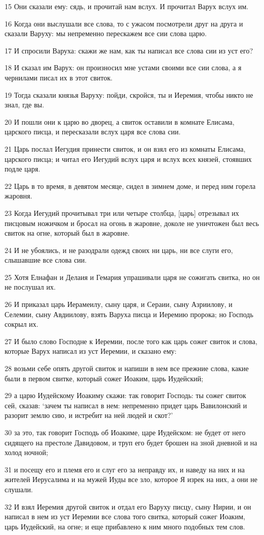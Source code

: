 \par 15 Они сказали ему: сядь, и прочитай нам вслух. И прочитал Варух вслух им.
\par 16 Когда они выслушали все слова, то с ужасом посмотрели друг на друга и сказали Варуху: мы непременно перескажем все сии слова царю.
\par 17 И спросили Варуха: скажи же нам, как ты написал все слова сии из уст его?
\par 18 И сказал им Варух: он произносил мне устами своими все сии слова, а я чернилами писал их в этот свиток.
\par 19 Тогда сказали князья Варуху: пойди, скройся, ты и Иеремия, чтобы никто не знал, где вы.
\par 20 И пошли они к царю во дворец, а свиток оставили в комнате Елисама, царского писца, и пересказали вслух царя все слова сии.
\par 21 Царь послал Иегудия принести свиток, и он взял его из комнаты Елисама, царского писца; и читал его Иегудий вслух царя и вслух всех князей, стоявших подле царя.
\par 22 Царь в то время, в девятом месяце, сидел в зимнем доме, и перед ним горела жаровня.
\par 23 Когда Иегудий прочитывал три или четыре столбца, [царь] отрезывал их писцовым ножичком и бросал на огонь в жаровне, доколе не уничтожен был весь свиток на огне, который был в жаровне.
\par 24 И не убоялись, и не разодрали одежд своих ни царь, ни все слуги его, слышавшие все слова сии.
\par 25 Хотя Елнафан и Делаия и Гемария упрашивали царя не сожигать свитка, но он не послушал их.
\par 26 И приказал царь Иерамеилу, сыну царя, и Сераии, сыну Азриилову, и Селемии, сыну Авдиилову, взять Варуха писца и Иеремию пророка; но Господь сокрыл их.
\par 27 И было слово Господне к Иеремии, после того как царь сожег свиток и слова, которые Варух написал из уст Иеремии, и сказано ему:
\par 28 возьми себе опять другой свиток и напиши в нем все прежние слова, какие были в первом свитке, который сожег Иоаким, царь Иудейский;
\par 29 а царю Иудейскому Иоакиму скажи: так говорит Господь: ты сожег свиток сей, сказав: `зачем ты написал в нем: непременно придет царь Вавилонский и разорит землю сию, и истребит на ней людей и скот?'
\par 30 за это, так говорит Господь об Иоакиме, царе Иудейском: не будет от него сидящего на престоле Давидовом, и труп его будет брошен на зной дневной и на холод ночной;
\par 31 и посещу его и племя его и слуг его за неправду их, и наведу на них и на жителей Иерусалима и на мужей Иуды все зло, которое Я изрек на них, а они не слушали.
\par 32 И взял Иеремия другой свиток и отдал его Варуху писцу, сыну Нирии, и он написал в нем из уст Иеремии все слова того свитка, который сожег Иоаким, царь Иудейский, на огне; и еще прибавлено к ним много подобных тем слов.

